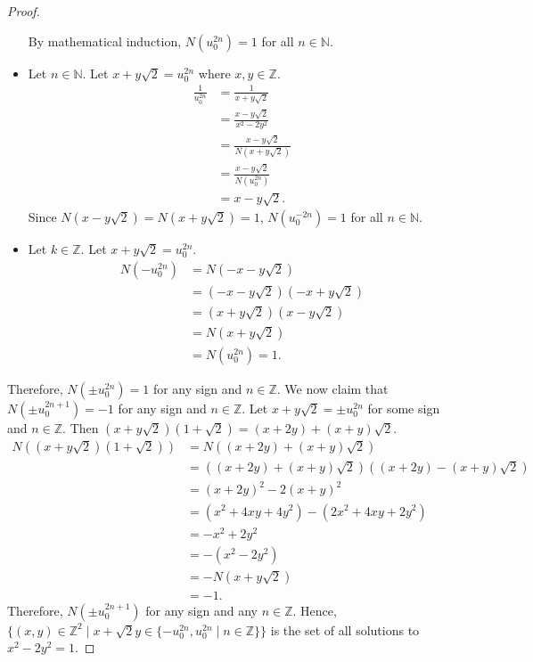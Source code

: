 \documentclass[12pt, psamsfonts]{amsart}
\theoremstyle{definition}
\theoremstyle{remark}
\numberwithin{equation}{section}
\begin{document}
\begin{proof}
\begin{itemize}
      By mathematical induction, $N(u_0^{2n}) = 1$ for all $n \in \mathbb{N}$.
    \item
      Let $n \in \mathbb{N}$.
      Let $x + y\sqrt{2} = u_0^{2n}$ where $x, y \in \mathbb{Z}$.
      \begin{align*}
        \frac{1}{u_0^{2n}}
          &= \frac{1}{x + y\sqrt{2}} \\
          &= \frac{x - y\sqrt{2}}{x^2 - 2y^2} \\
          &= \frac{x - y\sqrt{2}}{N(x + y\sqrt{2})} \\
          &= \frac{x - y\sqrt{2}}{N(u_0^{2n})} \\
          &= x - y\sqrt{2}.
      \end{align*}
      Since $N(x - y\sqrt{2}) = N(x + y\sqrt{2}) = 1$, $N(u_0^{-2n}) = 1$ for all $n \in \mathbb{N}$.
    \item
      Let $k \in \mathbb{Z}$.
      Let $x + y\sqrt{2} = u_0^{2n}$.
      \begin{align*}
        N(-u_0^{2n})
          &= N(-x - y\sqrt{2}) \\
          &= (-x - y\sqrt{2})(-x + y\sqrt{2}) \\
          &= (x + y\sqrt{2})(x - y\sqrt{2}) \\
          &= N(x + y\sqrt{2}) \\
          &= N(u_0^{2n}) = 1.
      \end{align*}
  \end{itemize}
  Therefore, $N(\pm u_0^{2n}) = 1$ for any sign and $n \in \mathbb{Z}$.
  We now claim that $N(\pm u_0^{2n + 1}) = -1$ for any sign and $n \in \mathbb{Z}$.
  Let $x + y\sqrt{2} = \pm u_0^{2n}$ for some sign and $n \in \mathbb{Z}$.
  Then $(x + y\sqrt{2})(1 + \sqrt{2}) = (x + 2y) + (x + y)\sqrt{2}$.
  \begin{align*}
    N((x + y\sqrt{2})(1 + \sqrt{2}))
      &= N((x + 2y) + (x + y)\sqrt{2}) \\
      &= ((x + 2y) + (x + y)\sqrt{2})((x + 2y) - (x + y)\sqrt{2}) \\
      &= (x + 2y)^2 - 2(x + y)^2 \\
      &= (x^2 + 4xy + 4y^2) - (2x^2 + 4xy + 2y^2) \\
      &= -x^2 + 2y^2 \\
      &= -(x^2 - 2y^2) \\
      &= -N(x + y\sqrt{2}) \\
      &= -1.
  \end{align*}
  Therefore, $N(\pm u_0^{2n + 1})$ for any sign and any $n \in \mathbb{Z}$.
  Hence, $\{ (x, y) \in \mathbb{Z}^2 \mid x + \sqrt{2}y \in \{ -u_0^{2n}, u_0^{2n} \mid n \in \mathbb{Z} \} \}$ is the set of all solutions to $x^2 - 2y^2 = 1$.
\end{proof}
\end{document}
